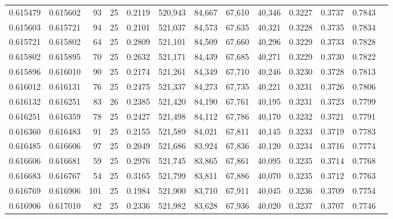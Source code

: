 \begin{tabular}{rrrrrrrrrrrrr}
0.615479 & 0.615602 &    93 &  25 &                                     0.2119 & 520,943 &  84,667 &  67,610 &  40,346 & 0.3227 & 0.3737 & 0.7843 \\
0.615603 & 0.615721 &    94 &  25 &                                     0.2101 & 521,037 &  84,573 &  67,635 &  40,321 & 0.3228 & 0.3735 & 0.7834 \\
0.615721 & 0.615802 &    64 &  25 &                                     0.2809 & 521,101 &  84,509 &  67,660 &  40,296 & 0.3229 & 0.3733 & 0.7828 \\
0.615802 & 0.615895 &    70 &  25 &                                     0.2632 & 521,171 &  84,439 &  67,685 &  40,271 & 0.3229 & 0.3730 & 0.7822 \\
0.615896 & 0.616010 &    90 &  25 &                                     0.2174 & 521,261 &  84,349 &  67,710 &  40,246 & 0.3230 & 0.3728 & 0.7813 \\
0.616012 & 0.616131 &    76 &  25 &                                     0.2475 & 521,337 &  84,273 &  67,735 &  40,221 & 0.3231 & 0.3726 & 0.7806 \\
0.616132 & 0.616251 &    83 &  26 &                                     0.2385 & 521,420 &  84,190 &  67,761 &  40,195 & 0.3231 & 0.3723 & 0.7799 \\
0.616251 & 0.616359 &    78 &  25 &                                     0.2427 & 521,498 &  84,112 &  67,786 &  40,170 & 0.3232 & 0.3721 & 0.7791 \\
0.616360 & 0.616483 &    91 &  25 &                                     0.2155 & 521,589 &  84,021 &  67,811 &  40,145 & 0.3233 & 0.3719 & 0.7783 \\
0.616485 & 0.616606 &    97 &  25 &                                     0.2049 & 521,686 &  83,924 &  67,836 &  40,120 & 0.3234 & 0.3716 & 0.7774 \\
0.616606 & 0.616681 &    59 &  25 &                                     0.2976 & 521,745 &  83,865 &  67,861 &  40,095 & 0.3235 & 0.3714 & 0.7768 \\
0.616683 & 0.616767 &    54 &  25 &                                     0.3165 & 521,799 &  83,811 &  67,886 &  40,070 & 0.3235 & 0.3712 & 0.7763 \\
0.616769 & 0.616906 &   101 &  25 &                                     0.1984 & 521,900 &  83,710 &  67,911 &  40,045 & 0.3236 & 0.3709 & 0.7754 \\
0.616906 & 0.617010 &    82 &  25 &                                     0.2336 & 521,982 &  83,628 &  67,936 &  40,020 & 0.3237 & 0.3707 & 0.7746 \\

\end{tabular}
